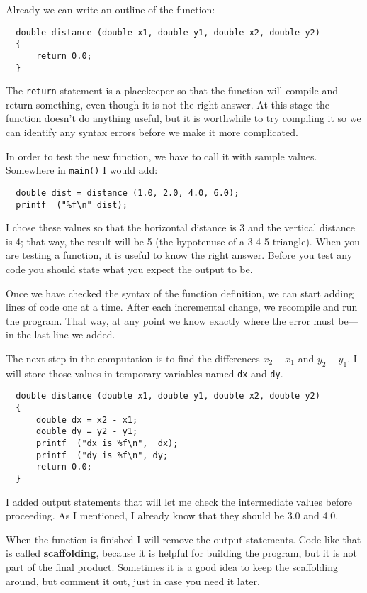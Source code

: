 Already we can write an outline of the function:

\begin{verbatim}
  double distance (double x1, double y1, double x2, double y2) 
  {
      return 0.0;
  }
\end{verbatim}
%
The {\tt return} statement is a placekeeper so that the function will
compile and return something, even though it is not the right answer.
At this stage the function doesn't do anything useful, but it is
worthwhile to try compiling it so we can identify any syntax errors
before we make it more complicated.

In order to test the new function, we have to call it with
sample values.  Somewhere in {\tt main()} I would add:

\begin{verbatim}
  double dist = distance (1.0, 2.0, 4.0, 6.0);
  printf  ("%f\n" dist);
\end{verbatim}
%
I chose these values so that the horizontal
distance is 3 and the vertical distance is 4; that way,
the result will be 5 (the hypotenuse of a 3-4-5 triangle).
When you are testing a function, it is useful to know the right
answer. Before you test any code you should 
state what you expect the output to be.

Once we have checked the syntax of the function definition, we
can start adding lines of code one at a time.  After each
incremental change, we recompile and run the program.  That
way, at any point we know exactly where the error must be---in
the last line we added.

The next step in the computation is to find the differences
$x_2 - x_1$ and $y_2 - y_1$.  I will store those values in
temporary variables named {\tt dx} and {\tt dy}.

\begin{verbatim}
  double distance (double x1, double y1, double x2, double y2) 
  {
      double dx = x2 - x1;
      double dy = y2 - y1;
      printf  ("dx is %f\n",  dx);
      printf  ("dy is %f\n", dy;
      return 0.0;
  }
\end{verbatim}
%
I added output statements that will let me check the intermediate
values before proceeding.  As I mentioned, I already know that they
should be 3.0 and 4.0.


When the function is finished I will remove the output statements.  Code
like that is called {\bf scaffolding}, because it is helpful for
building the program, but it is not part of the final product.
Sometimes it is a good idea to keep the scaffolding around, but
comment it out, just in case you need it later.

